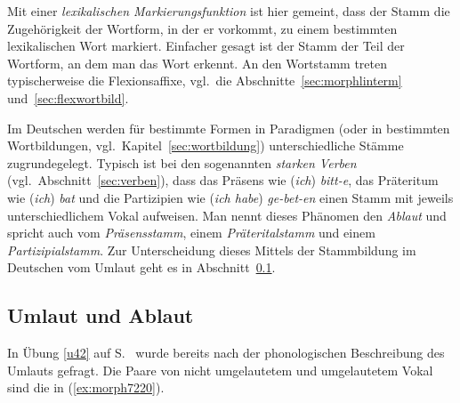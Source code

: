 \Stretch[0.5]


\Stretch[0.5]

Mit einer \textit{lexikalischen Markierungsfunktion} ist hier gemeint, dass der Stamm die Zugehörigkeit der Wortform, in der er vorkommt, zu einem bestimmten lexikalischen Wort markiert.
Einfacher gesagt ist der Stamm der Teil der Wortform, an dem man das Wort erkennt.
An den Wortstamm treten typischerweise die Flexionsaffixe, vgl.\ die Abschnitte~\ref{sec:morphlinterm} und~\ref{sec:flexwortbild}.

Im Deutschen werden für bestimmte Formen in Paradigmen (oder in bestimmten Wortbildungen, vgl.\ Kapitel~\ref{sec:wortbildung}) unterschiedliche Stämme zugrundegelegt.
Typisch ist \zB bei den sogenannten \textit{starken Verben} (vgl.\ Abschnitt~\ref{sec:verben}), dass das Präsens wie (\textit{ich}) \textit{bitt-e}, das Präteritum wie (\textit{ich}) \textit{bat} und die Partizipien wie (\textit{ich habe}) \textit{ge-bet-en} einen Stamm mit jeweils unterschiedlichem Vokal aufweisen.
Man nennt dieses Phänomen den \textit{Ablaut} und spricht auch vom \textit{Präsensstamm}, einem \textit{Präteritalstamm} und einem \textit{Partizipialstamm}.
Zur Unterscheidung dieses Mittels der Stammbildung im Deutschen vom Umlaut geht es in Abschnitt~\ref{sec:umablaut}.

\subsection{Umlaut und Ablaut}

\label{sec:umablaut}

In Übung \ref{u42} auf S.~\pageref{u42} wurde bereits nach der phonologischen Beschreibung des Umlauts gefragt.
Die Paare von nicht umgelautetem und umgelautetem Vokal sind die in (\ref{ex:morph7220}).

\begin{exe}
  \ex\label{ex:morph7220}
  \begin{xlist}
  \end{xlist}
\end{exe}

